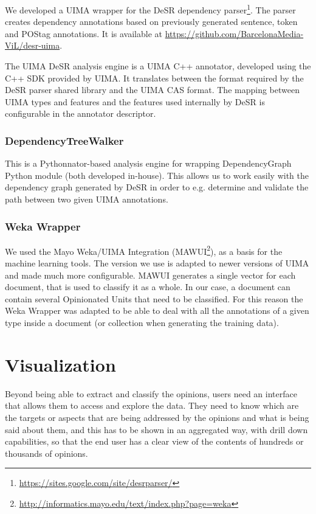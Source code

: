 \documentclass{llncs}
\begin{document}
We developed a UIMA wrapper for the DeSR dependency parser\footnote{\url{https://sites.google.com/site/desrparser/}}. The parser creates dependency annotations based on previously generated sentence, token and POStag annotations. It is available at \url{https://github.com/BarcelonaMedia-ViL/desr-uima}.

The UIMA DeSR analysis engine is a UIMA C++ annotator, developed using the C++ SDK provided by UIMA. It translates between the format required by the DeSR parser shared library and the UIMA CAS format. The mapping between UIMA types and features and the features used internally by DeSR is configurable in the annotator descriptor.

\subsubsection{DependencyTreeWalker}

This is a Pythonnator-based analysis engine for wrapping DependencyGraph Python module (both developed in-house). This allows us to work easily with the dependency graph generated by DeSR in order to e.g. determine and validate the path between two given UIMA annotations.

\subsubsection{Weka Wrapper}

We used the Mayo Weka/UIMA Integration (MAWUI\footnote{\url{http://informatics.mayo.edu/text/index.php?page=weka}}), as a basis for the machine learning tools. The version we use is adapted to newer versions of UIMA and made much more configurable. MAWUI generates a single vector for each document, that is used to classify it as a whole. In our case, a document can contain several Opinionated Units that need to be classified. For this reason the Weka Wrapper was adapted to be able to deal with all the annotations of a given type inside a document (or collection when generating the training data).

\section{Visualization}

Beyond being able to extract and classify the opinions, users need an interface that allows them to access and explore the data. They need to know which are the targets or aspects that are being addressed by the opinions and what is being said about them, and this has to be shown in an aggregated way, with drill down capabilities, so that the end user has a clear view of the contents of hundreds or thousands of opinions.
\end{document}
